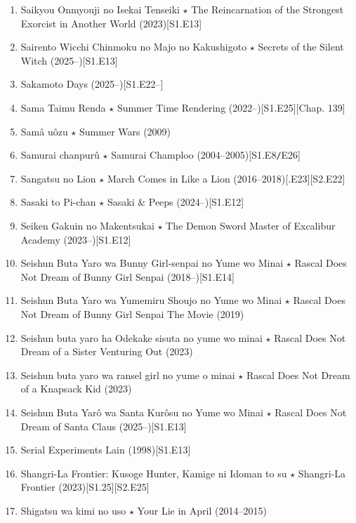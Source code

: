 \documentclass{article}
\begin{document}
\begin{enumerate}
    \item {\sc Saikyou Onmyouji no Isekai Tenseiki $\star$ The Reincarnation of the Strongest Exorcist in Another World} (2023)\hfill[S1.E13]
    \item {\sc Sairento Wicchi Chinmoku no Majo no Kakushigoto $\star$ Secrets of the Silent Witch} (2025--)\hfill[S1.E13]
    \item Sakamoto Days (2025--)\hfill[S1.E22--]
    \item {\sc Sama Taimu Renda $\star$ Summer Time Rendering} (2022--)\hfill[S1.E25][Chap. 139]
    \item {\sc Samâ uôzu $\star$ Summer Wars} (2009)
    \item Samurai chanpurû $\star$ Samurai Champloo (2004--2005)\hfill[S1.E8{\tt/}E26]
    \item {\sc Sangatsu no Lion $\star$ March Comes in Like a Lion} (2016--2018)\hfill[.E23][S2.E22]
    \item {\sc Sasaki to Pi-chan $\star$ Sasaki \& Peeps} (2024--)\hfill[S1.E12]
    \item {\sc Seiken Gakuin no Makentsukai $\star$ The Demon Sword Master of Excalibur Academy} (2023--)\hfill[S1.E12]
    \item {\sc Seishun Buta Yaro wa Bunny Girl-senpai no Yume wo Minai $\star$ Rascal Does Not Dream of Bunny Girl Senpai} (2018--)\hfill[S1.E14]
    \item {\sc Seishun Buta Yaro wa Yumemiru Shoujo no Yume wo Minai $\star$ Rascal Does Not Dream of Bunny Girl Senpai The Movie} (2019)
    \item {\sc Seishun buta yaro ha Odekake sisuta no yume wo minai $\star$ Rascal Does Not Dream of a Sister Venturing Out} (2023)
    \item {\sc Seishun buta yaro wa ransel girl no yume o minai $\star$ Rascal Does Not Dream of a Knapsack Kid} (2023)
    \item {\sc Seishun Buta Yarô wa Santa Kurôsu no Yume wo Minai $\star$ Rascal Does Not Dream of Santa Claus} (2025--)\hfill[S1.E13]
    \item {\sc Serial Experiments Lain} (1998)\hfill[S1.E13]
    \item {\sc Shangri-La Frontier: Kusoge Hunter, Kamige ni Idoman to su $\star$ Shangri-La Frontier} (2023)\hfill[S1.25][S2.E25]
    \item {\sc Shigatsu wa kimi no uso $\star$ Your Lie in April} (2014--2015)


\end{enumerate}
\end{document}
